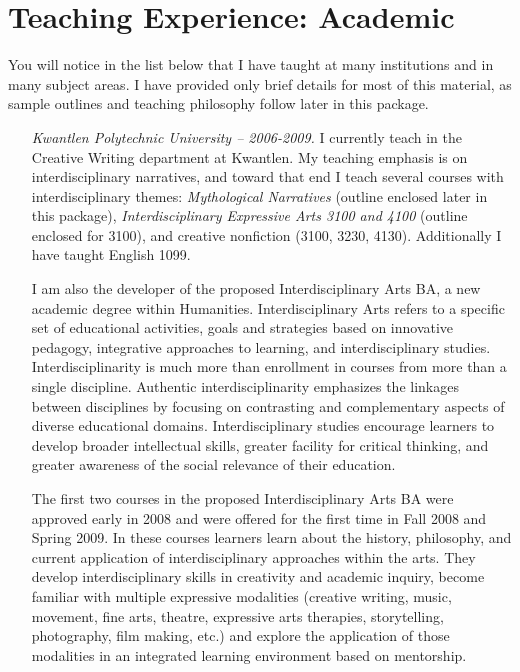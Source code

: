 \documentclass[10pt,DIV09,letterpaper,oneside,headsepline]{scrreprt}
\begin{document}
\chapter{Teaching Experience: Academic}

You will notice in the list below that I have taught at many institutions and in many subject areas. I have provided only brief details for most of this material, as sample outlines and teaching philosophy follow later in this package.

\begin{itemize}

\item [\textit{Kwantlen Polytechnic University -- 2006-2009.}] I currently teach in the Creative Writing department at Kwantlen. My teaching emphasis is on interdisciplinary narratives, and toward that end I teach several courses with interdisciplinary themes: \textit{Mythological Narratives} (outline enclosed later in this package), \textit{Interdisciplinary Expressive Arts 3100 and 4100} (outline enclosed for 3100), and creative nonfiction (3100, 3230, 4130). Additionally I have taught English 1099.

I am also the developer of the proposed Interdisciplinary Arts BA, a new academic degree within Humanities. Interdisciplinary Arts refers to a specific set of educational activities, goals and strategies based on innovative pedagogy, integrative approaches to learning, and interdisciplinary studies. Interdisciplinarity is much more than enrollment in courses from more than a single discipline. Authentic interdisciplinarity emphasizes the linkages between disciplines by focusing on contrasting and complementary aspects of diverse educational domains. Interdisciplinary studies encourage learners to develop broader intellectual skills, greater facility for critical thinking, and greater awareness of the social relevance of their education.

The first two courses in the proposed Interdisciplinary Arts BA were approved early in 2008 and were offered for the first time in Fall 2008 and Spring 2009. In these courses learners learn about the history, philosophy, and current application of interdisciplinary approaches within the arts. They develop interdisciplinary skills in creativity and academic inquiry, become familiar with multiple expressive modalities (creative writing, music, movement, fine arts, theatre, expressive arts therapies, storytelling, photography, film making, etc.) and explore the application of those modalities in an integrated learning environment based on mentorship.


\end{itemize}
\end{document}
